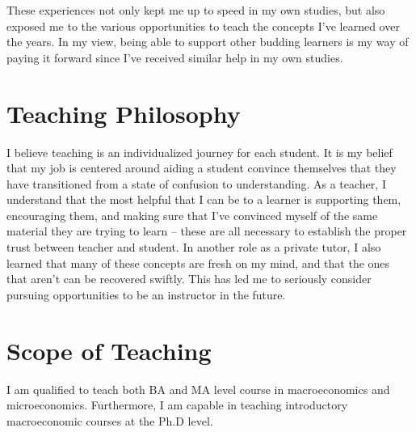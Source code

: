 \documentclass{scrartcl}
\begin{document}
\par These experiences not only kept me up to speed in my own studies, but also exposed me to the various opportunities to teach the concepts I've learned over the years. In my view, being able to support other budding learners is my way of paying it forward since I've received similar help in my own studies.

\section{Teaching Philosophy}

\par I believe teaching is an individualized journey for each student. It is my belief that my job is centered around aiding a student convince themselves that they have transitioned from a state of confusion to understanding. As a teacher, I understand that the most helpful that I can be to a learner is supporting them, encouraging them, and making sure that I've convinced myself of the same material they are trying to learn -- these are all necessary to establish the proper trust between teacher and student. In another role as a private tutor, I also learned that many of these concepts are fresh on my mind, and that the ones that aren't can be recovered swiftly. This has led me to seriously consider pursuing opportunities to be an instructor in the future.


\section{Scope of Teaching}

\par I am qualified to teach both BA and MA level course in macroeconomics and microeconomics. Furthermore, I am capable in teaching introductory macroeconomic courses at the Ph.D level.  

\par
\end{document}
